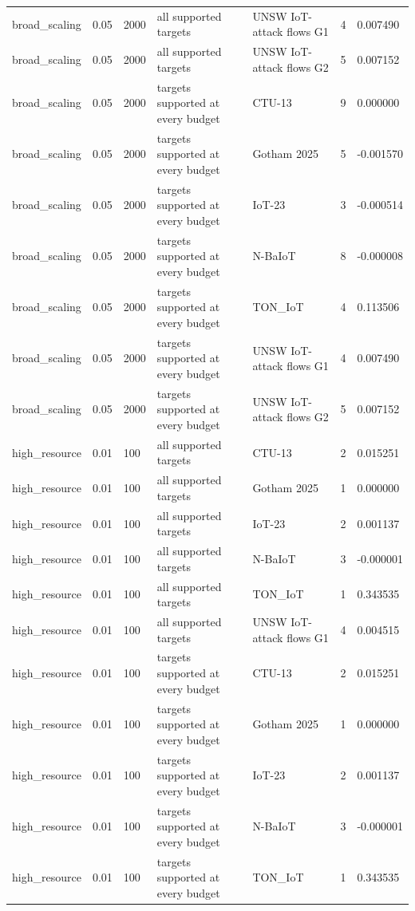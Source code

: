 \begin{tabular}{lllllll}
broad\_scaling & 0.05 & 2000 & all supported targets & UNSW IoT-attack flows G1 & 4 & 0.007490 \\
broad\_scaling & 0.05 & 2000 & all supported targets & UNSW IoT-attack flows G2 & 5 & 0.007152 \\
broad\_scaling & 0.05 & 2000 & targets supported at every budget & CTU-13 & 9 & 0.000000 \\
broad\_scaling & 0.05 & 2000 & targets supported at every budget & Gotham 2025 & 5 & -0.001570 \\
broad\_scaling & 0.05 & 2000 & targets supported at every budget & IoT-23 & 3 & -0.000514 \\
broad\_scaling & 0.05 & 2000 & targets supported at every budget & N-BaIoT & 8 & -0.000008 \\
broad\_scaling & 0.05 & 2000 & targets supported at every budget & TON\_IoT & 4 & 0.113506 \\
broad\_scaling & 0.05 & 2000 & targets supported at every budget & UNSW IoT-attack flows G1 & 4 & 0.007490 \\
broad\_scaling & 0.05 & 2000 & targets supported at every budget & UNSW IoT-attack flows G2 & 5 & 0.007152 \\
high\_resource & 0.01 & 100 & all supported targets & CTU-13 & 2 & 0.015251 \\
high\_resource & 0.01 & 100 & all supported targets & Gotham 2025 & 1 & 0.000000 \\
high\_resource & 0.01 & 100 & all supported targets & IoT-23 & 2 & 0.001137 \\
high\_resource & 0.01 & 100 & all supported targets & N-BaIoT & 3 & -0.000001 \\
high\_resource & 0.01 & 100 & all supported targets & TON\_IoT & 1 & 0.343535 \\
high\_resource & 0.01 & 100 & all supported targets & UNSW IoT-attack flows G1 & 4 & 0.004515 \\
high\_resource & 0.01 & 100 & targets supported at every budget & CTU-13 & 2 & 0.015251 \\
high\_resource & 0.01 & 100 & targets supported at every budget & Gotham 2025 & 1 & 0.000000 \\
high\_resource & 0.01 & 100 & targets supported at every budget & IoT-23 & 2 & 0.001137 \\
high\_resource & 0.01 & 100 & targets supported at every budget & N-BaIoT & 3 & -0.000001 \\
high\_resource & 0.01 & 100 & targets supported at every budget & TON\_IoT & 1 & 0.343535 \\

\end{tabular}

